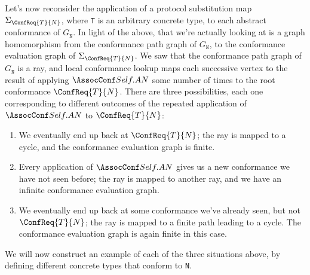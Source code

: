 \documentclass[../generics]{subfiles}
\begin{document}
Let's now reconsider the application of a protocol substitution map $\Sigma_{\ConfReq{T}{N}}$, where \texttt{T} is an arbitrary concrete type, to each abstract conformance of $G_{\texttt{N}}$. In light of the above, that we're actually looking at is a graph homomorphism from the conformance path graph of $G_{\texttt{N}}$, to the conformance evaluation graph of $\Sigma_{\ConfReq{T}{N}}$. We saw that the conformance path graph of $G_{\texttt{N}}$ is a ray, and local conformance lookup maps each successive vertex to the result of applying $\SelfAToN$ some number of times to the root conformance $\ConfReq{T}{N}$. There are three possibilities, each one corresponding to different outcomes of the repeated application of $\SelfAToN$ to $\ConfReq{T}{N}$:
\begin{enumerate}
\item We eventually end up back at $\ConfReq{T}{N}$; the ray is mapped to a cycle, and the conformance evaluation graph is finite.
\item Every application of $\SelfAToN$ gives us a new conformance we have not seen before; the ray is mapped to another ray, and we have an infinite conformance evaluation graph.
\item We eventually end up back at some conformance we've already seen, but not $\ConfReq{T}{N}$; the ray is mapped to a finite path leading to a cycle. The conformance evaluation graph is again finite in this case.
\end{enumerate}
We will now construct an example of each of the three situations above, by defining different concrete types that conform to \texttt{N}.
\end{document}
